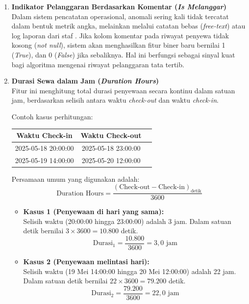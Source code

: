 \begin{enumerate}
    \item \textbf{Indikator Pelanggaran Berdasarkan Komentar (\textit{Is Melanggar})} \\
    Dalam sistem pencatatan operasional, anomali sering kali tidak tercatat dalam bentuk metrik angka, melainkan melalui catatan bebas (\textit{free-text}) atau log laporan dari staf \cite{aggarwal2017outlier}. Jika kolom komentar pada riwayat penyewa tidak kosong (\textit{not null}), sistem akan menghasilkan fitur biner baru bernilai 1 (\textit{True}), dan 0 (\textit{False}) jika sebaliknya. Hal ini berfungsi sebagai sinyal kuat bagi algoritma mengenai riwayat pelanggaran tata tertib.

    \item \textbf{Durasi Sewa dalam Jam (\textit{Duration Hours})} \\
    Fitur ini menghitung total durasi penyewaan secara kontinu dalam satuan jam, berdasarkan selisih antara waktu \textit{check-out} dan waktu \textit{check-in}.
    
    {Contoh kasus perhitungan:}
    \begin{center}
        \begin{tabular}{|c|c|c|}
            \hline
            \textbf{Waktu Check-in} & \textbf{Waktu Check-out} \\
            \hline
            2025-05-18 20:00:00 & 2025-05-18 23:00:00\\
            \hline
            2025-05-19 14:00:00 & 2025-05-20 12:00:00\\
            \hline
        \end{tabular}
    \end{center}
    
    Persamaan umum yang digunakan adalah:
    \[
    \text{Duration Hours} = \frac{(\text{Check-out} - \text{Check-in})_{\text{detik}}}{3600}
    \]
    
    \begin{itemize}
        \item \textbf{Kasus 1 (Penyewaan di hari yang sama):} \\
        Selisih waktu (20:00:00 hingga 23:00:00) adalah 3 jam. Dalam satuan detik bernilai $3 \times 3600 = 10.800$ detik.
        \[
        \text{Durasi}_1 = \frac{10.800}{3600} = 3{,}0 \text{ jam}
        \]
        \item \textbf{Kasus 2 (Penyewaan melintasi hari):} \\
        Selisih waktu (19 Mei 14:00:00 hingga 20 Mei 12:00:00) adalah 22 jam. Dalam satuan detik bernilai $22 \times 3600 = 79.200$ detik.
        \[
        \text{Durasi}_2 = \frac{79.200}{3600} = 22{,}0 \text{ jam}
        \]
    \end{itemize}


\end{enumerate}
